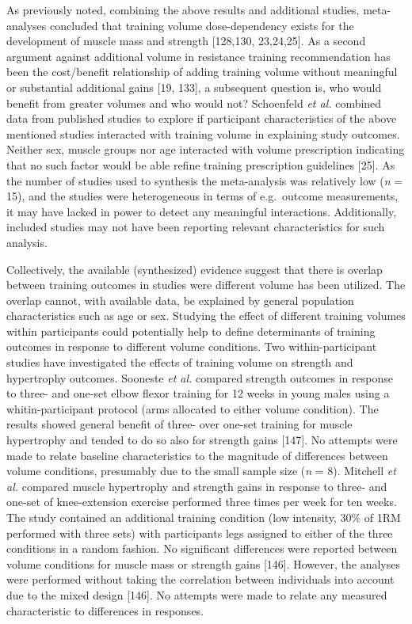 \documentclass[twoside,10pt]{gihclass} %
\begin{document}
As previously noted, combining the above results and additional studies, meta-analyses concluded that training volume dose-dependency exists for the development of muscle mass and strength
{[}128,130, 23,24,25{]}.
As a second argument against additional volume in resistance training recommendation has been the cost/benefit relationship of adding training volume without meaningful or substantial additional gains
{[}19, 133{]},
a subsequent question is, who would benefit from greater volumes and who would not?
Schoenfeld \emph{et al.} combined data from published studies to explore if participant characteristics of the above mentioned studies interacted with training volume in explaining study outcomes. Neither sex, muscle groups nor age interacted with volume prescription indicating that no such factor would be able refine training prescription guidelines
{[}25{]}.
As the number of studies used to synthesis the meta-analysis was relatively low (\emph{n} = 15), and the studies were heterogeneous in terms of e.g.~outcome measurements, it may have lacked in power to detect any meaningful interactions. Additionally, included studies may not have been reporting relevant characteristics for such analysis.

Collectively, the available (synthesized) evidence suggest that there is overlap between training outcomes in studies were different volume has been utilized.
The overlap cannot, with available data, be explained by general population characteristics such as age or sex.
Studying the effect of different training volumes within participants could potentially help to define determinants of training outcomes in response to different volume conditions.
Two within-participant studies have investigated the effects of training volume on strength and hypertrophy outcomes.
Sooneste \emph{et al.} compared strength outcomes in response to three- and one-set elbow flexor training for 12 weeks in young males using a whitin-participant protocol (arms allocated to either volume condition).
The results showed general benefit of three- over one-set training for muscle hypertrophy and tended to do so also for strength gains {[}147{]}.
No attempts were made to relate baseline characteristics to the magnitude of differences between volume conditions, presumably due to the small sample size (\emph{n} = 8).
Mitchell \emph{et al.} compared muscle hypertrophy and strength gains in response to three- and one-set of knee-extension exercise performed three times per week for ten weeks.
The study contained an additional training condition (low intensity, 30\% of 1RM performed with three sets) with participants legs assigned to either of the three conditions in a random fashion.
No significant differences were reported between volume conditions for muscle mass or strength gains {[}146{]}.
However, the analyses were performed without taking the correlation between individuals into account due to the mixed design {[}146{]}.
No attempts were made to relate any measured characteristic to differences in responses.
\end{document}

